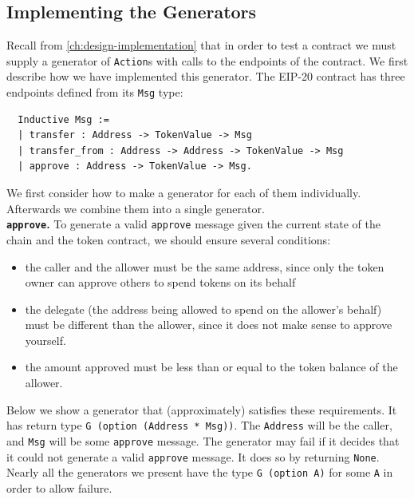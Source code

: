 \documentclass[twoside,11pt,openright]{report}
\newenvironment{code}{\captionsetup{type=figure, singlelinecheck=off, justification=raggedleft}}{}
\newcommand{\coq}[1]{\texttt{#1}}
\begin{document}
\subsection{Implementing the Generators}
Recall from \autoref{ch:design-implementation} that in order to test a contract we must supply a generator of \coq{Action}s with calls to the endpoints of the contract. We first describe how we have implemented this generator. The EIP-20 contract has three endpoints defined from its \coq{Msg} type:
\begin{code}
\label{def:EIP20-Msg}
\begin{verbatim}
  Inductive Msg := 
  | transfer : Address -> TokenValue -> Msg
  | transfer_from : Address -> Address -> TokenValue -> Msg
  | approve : Address -> TokenValue -> Msg.
\end{verbatim}
\end{code}
We first consider how to make a generator for each of them individually. Afterwards we combine them into a single generator. \medskip\\
\textbf{\coq{approve}.} To generate a valid \coq{approve} message given the current state of the chain and the token contract, we should ensure several conditions:
\begin{itemize}
    \item the caller and the allower must be the same address, since only the token owner can approve others to spend tokens on its behalf
    \item the delegate (the address being allowed to spend on the allower's behalf) must be different than the allower, since it does not make sense to approve yourself.
    \item the amount approved must be less than or equal to the token balance of the allower.
\end{itemize}
Below we show a generator that (approximately) satisfies these requirements. It has return type \coq{G (option (Address * Msg))}. The \coq{Address} will be the caller, and \coq{Msg} will be some \coq{approve} message. The generator may fail if it decides that it could not generate a valid \coq{approve} message. It does so by returning \coq{None}. Nearly all the generators we present have the type \coq{G (option A)} for some \coq{A} in order to allow failure.
\end{document}

